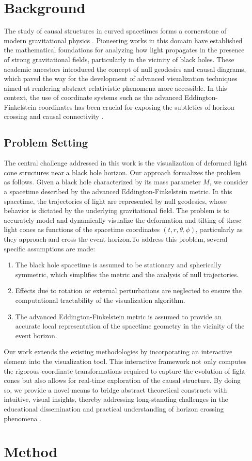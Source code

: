 \documentclass{article}
\begin{document}
\section{Background}The study of causal structures in curved spacetimes forms a cornerstone of modern gravitational physics \cite{Reference1 Reference2}. Pioneering works in this domain have established the mathematical foundations for analyzing how light propagates in the presence of strong gravitational fields, particularly in the vicinity of black holes. These academic ancestors introduced the concept of null geodesics and causal diagrams, which paved the way for the development of advanced visualization techniques aimed at rendering abstract relativistic phenomena more accessible. In this context, the use of coordinate systems such as the advanced Eddington-Finkelstein coordinates has been crucial for exposing the subtleties of horizon crossing and causal connectivity \cite{Reference3}.\subsection{Problem Setting}The central challenge addressed in this work is the visualization of deformed light cone structures near a black hole horizon. Our approach formalizes the problem as follows. Given a black hole characterized by its mass parameter $M$, we consider a spacetime described by the advanced Eddington-Finkelstein metric. In this spacetime, the trajectories of light are represented by null geodesics, whose behavior is dictated by the underlying gravitational field. The problem is to accurately model and dynamically visualize the deformation and tilting of these light cones as functions of the spacetime coordinates $(t, r, \theta, \phi)$, particularly as they approach and cross the event horizon.To address this problem, several specific assumptions are made:\begin{enumerate}  \item The black hole spacetime is assumed to be stationary and spherically symmetric, which simplifies the metric and the analysis of null trajectories.  \item Effects due to rotation or external perturbations are neglected to ensure the computational tractability of the visualization algorithm.  \item The advanced Eddington-Finkelstein metric is assumed to provide an accurate local representation of the spacetime geometry in the vicinity of the event horizon.\end{enumerate}Our work extends the existing methodologies by incorporating an interactive element into the visualization tool. This interactive framework not only computes the rigorous coordinate transformations required to capture the evolution of light cones but also allows for real-time exploration of the causal structure. By doing so, we provide a novel means to bridge abstract theoretical constructs with intuitive, visual insights, thereby addressing long-standing challenges in the educational dissemination and practical understanding of horizon crossing phenomena \cite{Reference4}.\section{Method}
\end{document}
